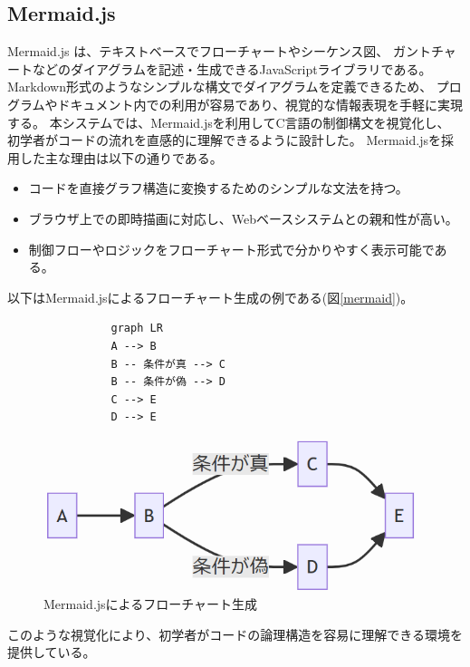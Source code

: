 \documentclass{cssspaper}
\begin{document}
            \subsection{Mermaid.js}
            Mermaid.js \cite{15}は、テキストベースでフローチャートやシーケンス図、
            ガントチャートなどのダイアグラムを記述・生成できるJavaScriptライブラリである。
            Markdown形式のようなシンプルな構文でダイアグラムを定義できるため、
            プログラムやドキュメント内での利用が容易であり、視覚的な情報表現を手軽に実現する。
            本システムでは、Mermaid.jsを利用してC言語の制御構文を視覚化し、
            初学者がコードの流れを直感的に理解できるように設計した。
            Mermaid.jsを採用した主な理由は以下の通りである。
            \begin{itemize}
                \item コードを直接グラフ構造に変換するためのシンプルな文法を持つ。
                \item ブラウザ上での即時描画に対応し、Webベースシステムとの親和性が高い。
                \item 制御フローやロジックをフローチャート形式で分かりやすく表示可能である。
            \end{itemize}
            以下はMermaid.jsによるフローチャート生成の例である(図\ref{mermaid})。
            \begin{lstlisting}
                graph LR
                A --> B
                B -- 条件が真 --> C
                B -- 条件が偽 --> D
                C --> E
                D --> E
            \end{lstlisting}
            \begin{figure}[h]
                \centering
                \includegraphics[width=13cm]{mermaid.png}
                \caption{Mermaid.jsによるフローチャート生成}
                \label{fig:mermaid}
            \end{figure}

            このような視覚化により、初学者がコードの論理構造を容易に理解できる環境を提供している。
\end{document}
